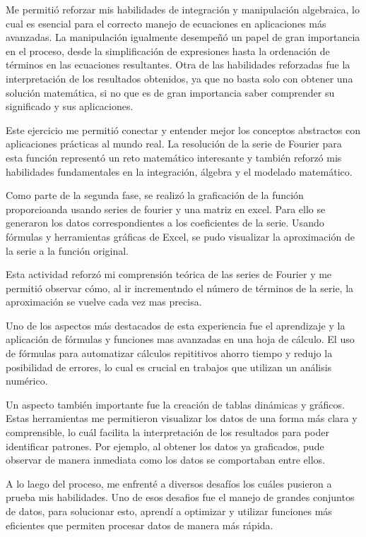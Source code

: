 {Me permitió reforzar mis habilidades de integración y manipulación algebraica, lo cual es esencial para el correcto manejo de ecuaciones en aplicaciones más avanzadas. 
La manipulación igualmente desempeñó un papel de gran importancia en el proceso, desde la simplificación de expresiones hasta la ordenación de términos en las ecuaciones resultantes. Otra de las habilidades reforzadas fue la interpretación de los resultados obtenidos, ya que no basta solo con obtener una solución matemática, si no que es de gran importancia saber comprender su significado y sus aplicaciones. 

Este ejercicio me permitió conectar y entender mejor los conceptos abstractos con aplicaciones prácticas al mundo real. La resolución de la serie de Fourier para esta función representó un reto matemático interesante y también reforzó mis habilidades fundamentales en la integración, álgebra y el modelado matemático.

Como parte de la segunda fase, se realizó la graficación de la función proporcioanda usando series de fourier y una matriz en excel. Para ello se generaron los datos correspondientes a los coeficientes de la serie. Usando fórmulas y herramientas gráficas de Excel, se pudo visualizar la aproximación de la serie a la función original. 

Esta actividad reforzó mi comprensión teórica de las series de Fourier y me permitió observar cómo, al ir incrementndo el número de términos de la serie, la aproximación se vuelve cada vez mas precisa. 

Uno de los aspectos más destacados de esta experiencia fue el aprendizaje y la aplicación de fórmulas y funciones mas avanzadas en una hoja de cálculo. El uso de fórmulas para automatizar cálculos repititivos ahorro tiempo y redujo la posibilidad de errores, lo cual es crucial en trabajos que utilizan un análisis numérico. 

Un aspecto también importante fue la creación de tablas dinámicas y gráficos. Estas herramientas me permitieron visualizar los datos de una forma más clara y comprensible, lo cuál facilita la interpretación de los resultados para poder identificar patrones. Por ejemplo, al obtener los datos ya graficados, pude observar de manera inmediata como los datos se comportaban entre ellos. 

A lo laego del proceso, me enfrenté a diversos desafíos los cuáles pusieron a prueba mis habilidades. Uno de esos desafios fue el manejo de grandes conjuntos de datos, para solucionar esto, aprendí a optimizar y utilizar funciones más eficientes que permiten procesar datos de manera más rápida. 

}
